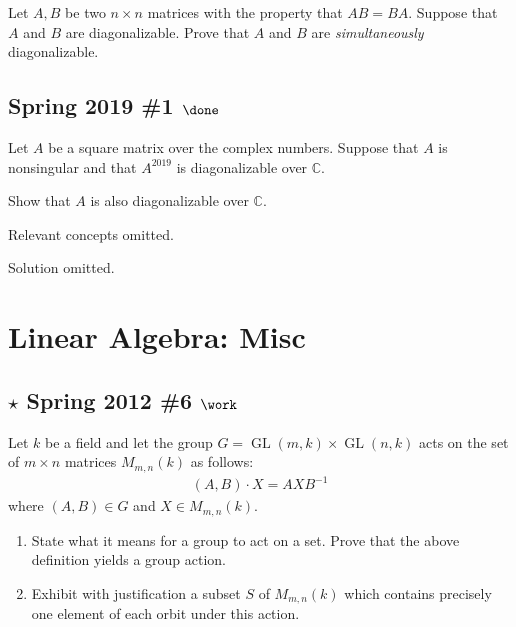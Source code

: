 Let \(A, B\) be two \(n\times n\) matrices with the property that
\(AB = BA\). Suppose that \(A\) and \(B\) are diagonalizable. Prove that
\(A\) and \(B\) are \emph{simultaneously} diagonalizable.

\hypertarget{spring-2019-1-done}{%
\subsection{\texorpdfstring{Spring 2019 \#1
\(\done\)}{Spring 2019 \#1 \textbackslash done}}\label{spring-2019-1-done}}

Let \(A\) be a square matrix over the complex numbers. Suppose that
\(A\) is nonsingular and that \(A^{2019}\) is diagonalizable over
\({\mathbb{C}}\).

Show that \(A\) is also diagonalizable over \({\mathbb{C}}\).

Relevant concepts omitted.

Solution omitted.

\hypertarget{linear-algebra-misc}{%
\section{Linear Algebra: Misc}\label{linear-algebra-misc}}

\hypertarget{star-spring-2012-6-work}{%
\subsection{\texorpdfstring{\(\star\) Spring 2012 \#6
\(\work\)}{\textbackslash star Spring 2012 \#6 \textbackslash work}}\label{star-spring-2012-6-work}}

Let \(k\) be a field and let the group
\(G = \operatorname{GL}(m, k) \times\operatorname{GL}(n, k)\) acts on
the set of \(m\times n\) matrices \(M_{m, n}(k)\) as follows:
\begin{align*}
(A, B) \cdot X = AXB^{-1}
\end{align*}
where \((A, B) \in G\) and \(X\in M_{m, n}(k)\).

\begin{enumerate}
\def\labelenumi{\alph{enumi}.}
\item
  State what it means for a group to act on a set. Prove that the above
  definition yields a group action.
\item
  Exhibit with justification a subset \(S\) of \(M_{m, n}(k)\) which
  contains precisely one element of each orbit under this action.
\end{enumerate}

